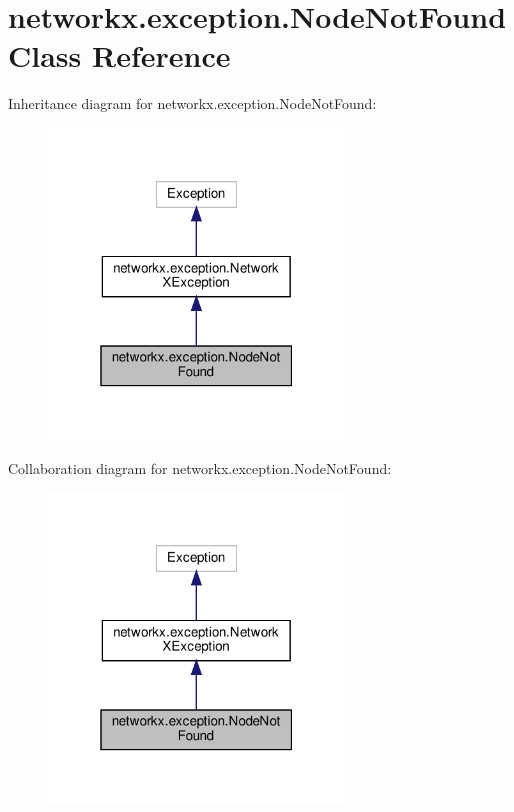\hypertarget{classnetworkx_1_1exception_1_1NodeNotFound}{}\section{networkx.\+exception.\+Node\+Not\+Found Class Reference}
\label{classnetworkx_1_1exception_1_1NodeNotFound}


Inheritance diagram for networkx.\+exception.\+Node\+Not\+Found\+:
\nopagebreak
\begin{figure}[H]
\begin{center}
\leavevmode
\includegraphics[width=223pt]{classnetworkx_1_1exception_1_1NodeNotFound__inherit__graph}
\end{center}
\end{figure}


Collaboration diagram for networkx.\+exception.\+Node\+Not\+Found\+:
\nopagebreak
\begin{figure}[H]
\begin{center}
\leavevmode
\includegraphics[width=223pt]{classnetworkx_1_1exception_1_1NodeNotFound__coll__graph}
\end{center}
\end{figure}


